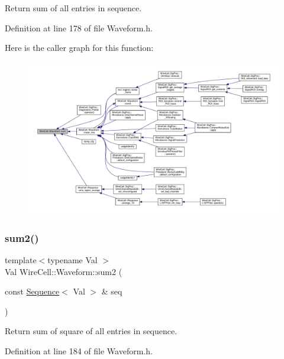 Return sum of all entries in sequence. 



Definition at line 178 of file Waveform.\+h.

Here is the caller graph for this function\+:
\nopagebreak
\begin{figure}[H]
\begin{center}
\leavevmode
\includegraphics[width=350pt]{namespace_wire_cell_1_1_waveform_a4c7b82a4567d6c94227398f9511ffb92_icgraph}
\end{center}
\end{figure}
\mbox{\label{namespace_wire_cell_1_1_waveform_a6aa0cf31fb8548b1f74ffb3f77350668}} 
\subsubsection{\texorpdfstring{sum2()}{sum2()}}
{\footnotesize\ttfamily template$<$typename Val $>$ \\
Val Wire\+Cell\+::\+Waveform\+::sum2 (\begin{DoxyParamCaption}\item[{const \hyperlink{namespace_wire_cell_1_1_waveform_a1d2a1b672e3b220dcd64a994531de95d}{Sequence}$<$ Val $>$ \&}]{seq }\end{DoxyParamCaption})}



Return sum of square of all entries in sequence. 



Definition at line 184 of file Waveform.\+h.


